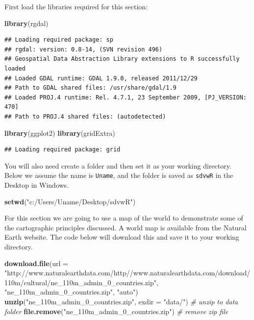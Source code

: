 \documentclass[]{article}
\newenvironment{Shaded}{}{}
\newcommand{\KeywordTok}[1]{\textcolor[rgb]{0.00,0.44,0.13}{\textbf{{#1}}}}
\newcommand{\DataTypeTok}[1]{\textcolor[rgb]{0.56,0.13,0.00}{{#1}}}
\newcommand{\StringTok}[1]{\textcolor[rgb]{0.25,0.44,0.63}{{#1}}}
\newcommand{\CommentTok}[1]{\textcolor[rgb]{0.38,0.63,0.69}{\textit{{#1}}}}
\newcommand{\NormalTok}[1]{{#1}}
\begin{document}
First load the libraries required for this section:

\begin{Shaded}
\begin{Highlighting}[]
\KeywordTok{library}\NormalTok{(rgdal)}
\end{Highlighting}
\end{Shaded}

\begin{verbatim}
## Loading required package: sp
## rgdal: version: 0.8-14, (SVN revision 496)
## Geospatial Data Abstraction Library extensions to R successfully loaded
## Loaded GDAL runtime: GDAL 1.9.0, released 2011/12/29
## Path to GDAL shared files: /usr/share/gdal/1.9
## Loaded PROJ.4 runtime: Rel. 4.7.1, 23 September 2009, [PJ_VERSION: 470]
## Path to PROJ.4 shared files: (autodetected)
\end{verbatim}

\begin{Shaded}
\begin{Highlighting}[]
\KeywordTok{library}\NormalTok{(ggplot2)}
\KeywordTok{library}\NormalTok{(gridExtra)}
\end{Highlighting}
\end{Shaded}

\begin{verbatim}
## Loading required package: grid
\end{verbatim}

You will also need create a folder and then set it as your working
directory. Below we assume the name is \texttt{Uname}, and the folder is
saved as \texttt{sdvwR} in the Desktop in Windows.

\begin{Shaded}
\begin{Highlighting}[]
\KeywordTok{setwd}\NormalTok{(}\StringTok{"c:/Users/Uname/Desktop/sdvwR"}\NormalTok{)}
\end{Highlighting}
\end{Shaded}

For this section we are going to use a map of the world to demonstrate
some of the cartographic principles discussed. A world map is available
from the Natural Earth website. The code below will download this and
save it to your working directory.

\begin{Shaded}
\begin{Highlighting}[]
\KeywordTok{download.file}\NormalTok{(}\DataTypeTok{url =} \StringTok{"http://www.naturalearthdata.com/http//www.naturalearthdata.com/download/110m/cultural/ne_110m_admin_0_countries.zip"}\NormalTok{, }
    \StringTok{"ne_110m_admin_0_countries.zip"}\NormalTok{, }\StringTok{"auto"}\NormalTok{)}
\KeywordTok{unzip}\NormalTok{(}\StringTok{"ne_110m_admin_0_countries.zip"}\NormalTok{, }\DataTypeTok{exdir =} \StringTok{"data/"}\NormalTok{)  }\CommentTok{# unzip to data folder}
\KeywordTok{file.remove}\NormalTok{(}\StringTok{"ne_110m_admin_0_countries.zip"}\NormalTok{)  }\CommentTok{# remove zip file}
\end{Highlighting}
\end{Shaded}
\end{document}
